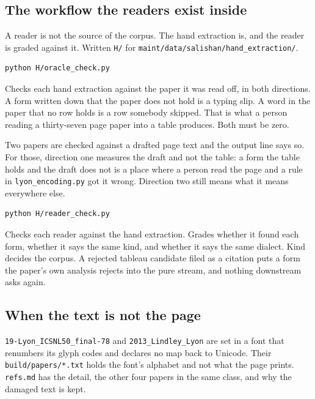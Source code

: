\subsection{The workflow the readers exist inside}

A reader is not the source of the corpus. The hand extraction is, and the reader is graded against it. Written \texttt{H/\allowbreak{}} for \texttt{maint/\allowbreak{}data/\allowbreak{}salishan/\allowbreak{}hand\_\allowbreak{}extraction/\allowbreak{}}.

\begin{lstlisting}[breaklines=true,breakatwhitespace=false,basicstyle=\ttfamily\small]
python H/oracle_check.py
\end{lstlisting}

Checks each hand extraction against the paper it was read off, in both directions. A form written down that the paper does not hold is a typing slip. A word in the paper that no row holds is a row somebody skipped. That is what a person reading a thirty-seven page paper into a table produces. Both must be zero.

Two papers are checked against a drafted page text and the output line says so. For those, direction one measures the draft and not the table: a form the table holds and the draft does not is a place where a person read the page and a rule in \texttt{lyon\_\allowbreak{}encoding.\allowbreak{}py} got it wrong. Direction two still means what it means everywhere else.

\begin{lstlisting}[breaklines=true,breakatwhitespace=false,basicstyle=\ttfamily\small]
python H/reader_check.py
\end{lstlisting}

Checks each reader against the hand extraction. Grades whether it found each form, whether it says the same kind, and whether it says the same dialect. Kind decides the corpus. A rejected tableau candidate filed as a citation puts a form the paper's own analysis rejects into the pure stream, and nothing downstream asks again.

\subsection{When the text is not the page}

\texttt{19-\allowbreak{}Lyon\_\allowbreak{}ICSNL50\_\allowbreak{}final-\allowbreak{}78} and \texttt{2013\_\allowbreak{}Lindley\_\allowbreak{}Lyon} are set in a font that renumbers its glyph codes and declares no map back to Unicode. Their \texttt{build/\allowbreak{}papers/\allowbreak{}*.\allowbreak{}txt} holds the font's alphabet and not what the page prints. \texttt{refs.\allowbreak{}md} has the detail, the other four papers in the same class, and why the damaged text is kept.

